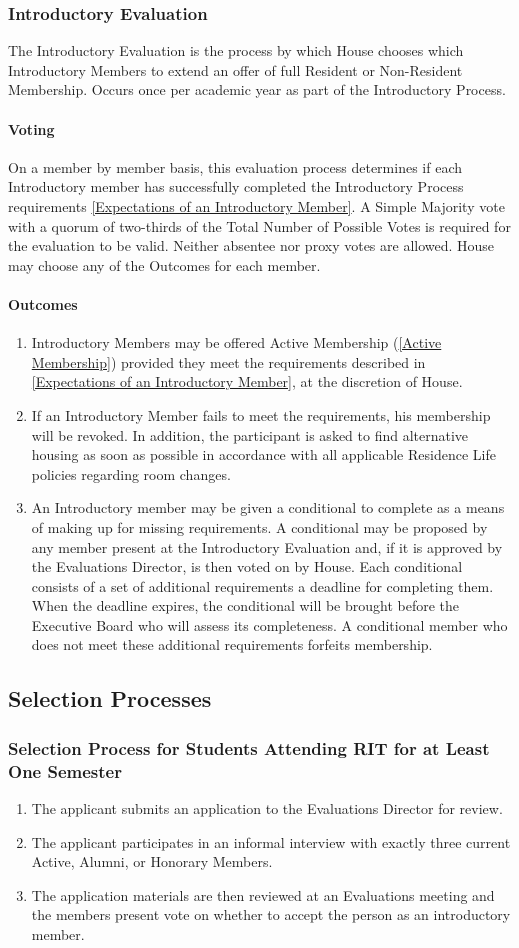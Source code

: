 \documentclass{article}
\newcommand{\bsection}[1]{\subsection{#1} \label{#1}}
\newcommand{\bsubsection}[1]{\subsubsection{#1} \label{#1}}
\newcommand{\bsubsubsection}[1]{\paragraph{#1} \label{#1}}
\begin{document}
\bsubsection{Introductory Evaluation}
The Introductory Evaluation is the process by which House chooses which Introductory Members to extend an offer of full Resident or Non-Resident Membership. Occurs once per academic year as part of the Introductory Process.
\bsubsubsection{Voting} 
On a member by member basis, this evaluation process determines if each Introductory member has successfully completed the Introductory Process requirements \ref{Expectations of an Introductory Member}. A Simple Majority vote with a quorum of two-thirds of the Total Number of Possible Votes is required for the evaluation to be valid. Neither absentee nor proxy votes are allowed. House may choose any of the Outcomes for each member.
\bsubsubsection{Outcomes} 
\renewcommand{\theenumi}{\alph{enumi}} %
\begin{enumerate}
	\item Introductory Members may be offered Active Membership (\ref{Active Membership}) provided they meet the requirements described in \ref{Expectations of an Introductory Member}, at the discretion of House.
	\item If an Introductory Member fails to meet the requirements, his membership will be revoked. In addition, the participant is asked to find alternative housing as soon as possible in accordance with all applicable Residence Life policies regarding room changes.
	\item An Introductory member may be given a conditional to complete as a means of making up for missing requirements. A conditional may be proposed by any member present at the Introductory Evaluation and, if it is approved by the Evaluations Director, is then voted on by House. Each conditional consists of a set of additional requirements a deadline for completing them. When the deadline expires, the conditional will be brought before the Executive Board who will assess its completeness. A conditional member who does not meet these additional requirements forfeits membership.
\end{enumerate}
\bsection{Selection Processes}
\renewcommand{\theenumi}{\alph{enumi}} %
\bsubsection{Selection Process for Students Attending RIT for at Least One Semester}
\begin{enumerate}
	\item The applicant submits an application to the Evaluations Director for review.
	\item The applicant participates in an informal interview with exactly three current Active, Alumni, or Honorary Members.
	\item The application materials are then reviewed at an Evaluations meeting and the members present vote on whether to accept the person as an introductory member.
\end{enumerate}
\end{document}
